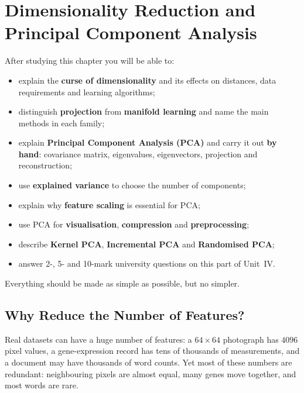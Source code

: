 \chapter{Dimensionality Reduction and Principal Component Analysis}
\label{ch:dimred}



\begin{objectives}
After studying this chapter you will be able to:
\begin{itemize}
  \item explain the \textbf{curse of dimensionality} and its effects on distances, data requirements and learning algorithms;
  \item distinguish \textbf{projection} from \textbf{manifold learning} and name the main methods in each family;
  \item explain \textbf{Principal Component Analysis (PCA)} and carry it out \textbf{by hand}: covariance matrix, eigenvalues, eigenvectors, projection and reconstruction;
  \item use \textbf{explained variance} to choose the number of components;
  \item explain why \textbf{feature scaling} is essential for PCA;
  \item use PCA for \textbf{visualisation}, \textbf{compression} and \textbf{preprocessing};
  \item describe \textbf{Kernel PCA}, \textbf{Incremental PCA} and \textbf{Randomised PCA};
  \item answer 2-, 5- and 10-mark university questions on this part of Unit~IV.
\end{itemize}
\end{objectives}

\begin{pullquote}
Everything should be made as simple as possible, but no simpler.
\end{pullquote}

\section{Why Reduce the Number of Features?}

Real datasets can have a huge number of features: a $64\times64$ photograph has $4096$ pixel values, a gene-expression record has tens of thousands of measurements, and a document may have thousands of word counts. Yet most of these numbers are redundant: neighbouring pixels are almost equal, many genes move together, and most words are rare.

